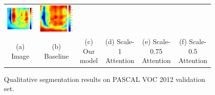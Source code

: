 \documentclass[10pt,twocolumn,letterpaper]{article}
\begin{document}
\begin{figure}
\begin{tabular}{c c c c c c}
   \includegraphics[height=0.11\linewidth]{fig/voc12/att2/2011_003271.pdf} &
   \includegraphics[height=0.11\linewidth]{fig/voc12/att3/2011_003271.pdf} \\
   {\scriptsize (a) Image} & 
   {\scriptsize (b) Baseline} & 
   {\scriptsize (c) Our model} & 
   {\scriptsize (d) Scale-1 Attention} & 
   {\scriptsize (e) Scale-0.75 Attention} &
   {\scriptsize (f) Scale-0.5 Attention} \\
  \end{tabular}
  \caption{Qualitative segmentation results on PASCAL VOC 2012 validation set.} 
  \label{fig:pascal_voc12_results}  
\end{figure}
\end{document}
